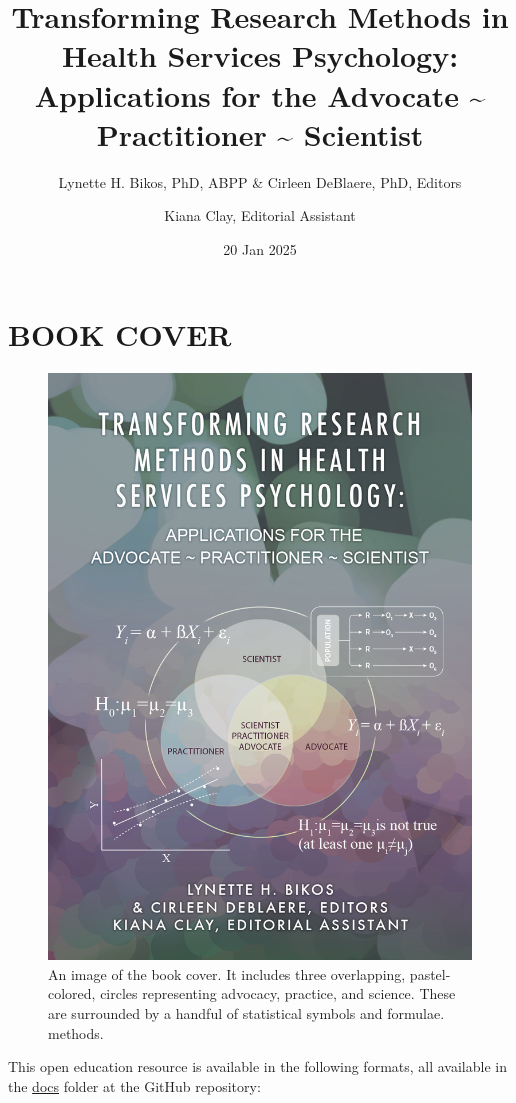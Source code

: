 \documentclass[
  11pt,
]{book}
\title{Transforming Research Methods in Health Services Psychology: Applications for the Advocate \textasciitilde{} Practitioner \textasciitilde{} Scientist}
\author{Lynette H. Bikos, PhD, ABPP \& Cirleen DeBlaere, PhD, Editors \and Kiana Clay, Editorial Assistant}
\date{20 Jan 2025}
\begin{document}
\maketitle

{
\hypersetup{linkcolor=}
\setcounter{tocdepth}{3}
\tableofcontents
}
\chapter*{BOOK COVER}\label{book-cover}


\begin{figure}
\centering
\includegraphics{images/bookcover.png}
\caption{An image of the book cover. It includes three overlapping, pastel-colored, circles representing advocacy, practice, and science. These are surrounded by a handful of statistical symbols and formulae. methods.}
\end{figure}

This open education resource is available in the following formats, all available in the \href{https://github.com/lhbikos/TransformingResearchMethods/tree/main/docs}{docs} folder at the GitHub repository:
\end{document}

